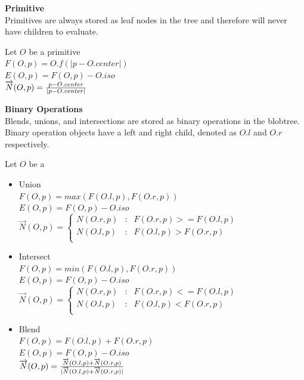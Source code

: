 \documentclass[conference]{acmsiggraph}
\begin{document}
\textbf{Primitive}\\
Primitives are always stored as leaf nodes in the tree and therefore will never
have children to evaluate.

Let $O$ be a primitive\\
$F(O, p) = O.f(\lvert p - O.center \rvert)$\\
$E(O, p) = F(O, p) - O.iso$\\
$\overrightarrow{N}(O, p) = {p - O.center \over \lvert p -
O.center \rvert}$


\textbf{Binary Operations}\\
Blends, unions, and intersections are stored as binary operations in the
blobtree. Binary operation objects have a left and right child, denoted as
$O.l$ and $O.r$ respectively.

Let $O$ be a
\begin{itemize}
	\item Union\\
		$F(O, p) = max(F(O.l, p), F(O.r, p))$\\
		$E(O, p) = F(O, p) - O.iso$\\
		$
		\overrightarrow{N}(O, p) = \left\{
			\begin{array}{lcl}
				N(O.r, p) & : &  F(O.r, p) >= F(O.l, p)\\
				N(O.l, p) & : &  F(O.l, p) >  F(O.r, p)\\
			\end{array}
		\right.
		$
	\item Intersect\\
		$F(O, p) = min(F(O.l, p), F(O.r, p))$\\
		$E(O, p) = F(O, p) - O.iso$\\
		$
		\overrightarrow{N}(O, p) = \left\{
			\begin{array}{lcl}
				N(O.r, p) & : &  F(O.r, p) <= F(O.l, p)\\
				N(O.l, p) & : &  F(O.l, p) <  F(O.r, p)\\
			\end{array}
		\right.
		$
	\item Blend\\
		$F(O, p) = F(O.l, p) + F(O.r, p)$\\
		$E(O, p) = F(O, p) - O.iso$\\
		$\overrightarrow{N}(O, p) = {\overrightarrow{N}(O.l, p) +
		\overrightarrow{N}(O.r, p) \over
		\lvert \overrightarrow{N}(O.l, p) + \overrightarrow{N}(O.r, p)
		\rvert}$\\
\end{itemize}
\end{document}
